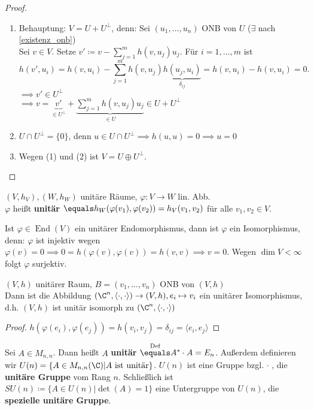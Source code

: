 \documentclass{article}
\begin{document}
    \begin{proof}
        \begin{enumerate}[(1)]
            \item Behauptung: $V = U + U^\perp$, denn:
            Sei $(u_1, \dots, u_n)$ ONB von $U$ ($\exists$ nach \ref{existenz_onb})\\
            Sei $v\in V$. Setze $v' \coloneqq v - \sum_{j = 1}^{m} h(v, u_j) u_j$.
            Für $i = 1,\dots, m$ ist $$h(v', u_i) = h(v, u_i) - \sum_{j = 1}^{m}h(v, u_j)\underbrace{h(u_j, u_i)}_{\delta_{ij}} = h(v, u_i) - h(v, u_i) = 0.$$
            $\implies v'\in U^\perp$\\
            $\implies v = \underbrace{v'}_{\in U^\perp} + \underbrace{\sum_{j = 1}^{m}h(v, u_j)u_j}_{\in U} \in U + U^\perp$
            \item $U\cap U^\perp = \{0\}$, denn $u \in U\cap U^\perp \implies h(u,u) = 0 \implies u = 0$
            \item Wegen (1) und (2) ist $V = U \oplus U^\perp$.
        \end{enumerate}
    \end{proof}
    \begin{definition}
        $(V, h_V), (W, h_W)$ unitäre Räume, $\varphi: V \to W$ lin. Abb.\\
        $\varphi$ heißt \textbf{unitär} $\equals h_W(\varphi(v_1), \varphi(v_2)) = h_V(v_1, v_2)$ für alle $v_1, v_2\in V$. 
    \end{definition}
    \begin{anmerkung}
        Ist $\varphi\in \operatorname{End}(V)$ ein unitärer Endomorphismus, dann ist $\varphi$ ein Isomorphismus, denn: $\varphi$ ist injektiv wegen $\varphi(v) = 0 \implies 0 = h(\varphi(v), \varphi(v)) = h(v,v) \implies v = 0$. Wegen $\dim V < \infty$ folgt $\varphi$ surjektiv.
    \end{anmerkung}
    \begin{bemerkung}
        $(V,h)$ unitärer Raum, $B = (v_1, \dots, v_n)$ ONB von $(V,h)$\\
        Dann ist die Abbildung $(\C^n, \langle \cdot, \cdot\rangle) \to (V, h), e_i \mapsto v_i$ ein unitärer Isomorphismus, d.h. $(V,h)$ ist unitär isomorph zu $(\C^n, \langle \cdot, \cdot \rangle)$
    \end{bemerkung}
    \begin{proof}
        $h(\varphi(e_i), \varphi(e_j)) = h(v_i, v_j) = \delta_{ij} = \langle e_i, e_j\rangle$
    \end{proof}
    \begin{definition}
        Sei $A \in M_{n,n}$. Dann heißt $A$ \textbf{unitär} $\overset{\text{Def}}{\equals} A^*\cdot A = E_n$. Außerdem definieren wir
        $U(n) = \{A \in M_{n,n}(\C)| A \text{ ist unitär}\}$. 
        $U(n)$ ist eine Gruppe bzgl. \glqq $\cdot$ \grqq, die \textbf{unitäre Gruppe} vom Rang $n$. Schließlich ist
        $SU(n)\coloneqq \{A \in U(n) | \det(A) = 1\}$ eine Untergruppe von $U(n)$, die \textbf{spezielle unitäre Gruppe}.
    \end{definition}
\end{document}
